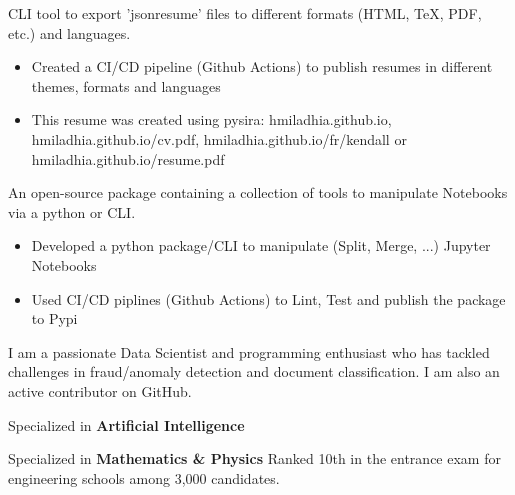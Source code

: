 \documentclass[10pt,letter,ragged2e,withhyper]{altacv}
\renewcommand{\divider}{\textcolor{body!30}{\hdashrule{\linewidth}{0.6pt}{0.5ex}}\medskip}
\begin{document}
\begin{paracol}{2}
CLI tool to export 'jsonresume' files to different formats (HTML, TeX, PDF, etc.) and languages.

\begin{itemize}
      \item Created a CI/CD pipeline (Github Actions) to publish resumes in different themes, formats and languages
      \item This resume was created using pysira: hmiladhia.github.io, hmiladhia.github.io/cv.pdf, hmiladhia.github.io/fr/kendall or hmiladhia.github.io/resume.pdf
  \end{itemize}

\divider
{}

An open-source package containing a collection of tools to manipulate Notebooks via a python or CLI.

\begin{itemize}
      \item Developed a python package/CLI to manipulate (Split, Merge, ...) Jupyter Notebooks
      \item Used CI/CD piplines (Github Actions) to Lint, Test and publish the package to Pypi
  \end{itemize}



\switchcolumn
{}
{\small
I am a passionate Data Scientist and programming enthusiast who has tackled challenges 
in fraud/anomaly detection and document classification. 
I am also an active contributor on GitHub.

}


{\small Specialized in \textbf{Artificial Intelligence}}

\divider
{}
{\small Specialized in \textbf{Mathematics \& Physics}}
{\small Ranked 10th in the entrance exam for engineering schools among 3,000 candidates.}




\end{paracol}
\end{document}
